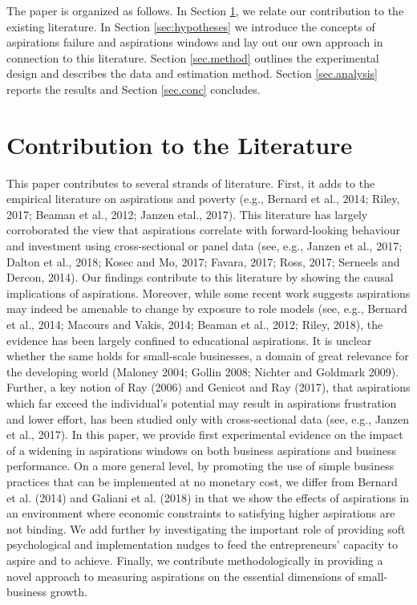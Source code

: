 \documentclass[11.5pt]{article}
\begin{document}
The paper is organized as follows. In Section \ref{sec:cont}, we relate our contribution to the existing literature. In Section \ref{sec:hypotheses} we introduce the concepts of aspirations failure and aspirations windows and lay out our own approach in connection to this literature. Section \ref{sec.method} outlines the experimental design and \label{sec.data} describes the data and estimation method. Section \ref{sec.analysis} reports the results and Section \ref{sec.conc} concludes.

\section{Contribution to the Literature} \label{sec:cont}

This paper contributes to several strands of literature. First, it adds to the empirical literature on aspirations and poverty (e.g., Bernard et al., 2014; Riley, 2017; Beaman et al., 2012; Janzen etal., 2017). This literature has largely corroborated the view that aspirations correlate with forward-looking behaviour and investment using cross-sectional or panel data (see, e.g., Janzen et al., 2017; Dalton et al., 2018; Kosec and Mo, 2017; Favara, 2017; Ross, 2017; Serneels and Dercon, 2014). Our findings contribute to this literature by showing the causal implications of aspirations. Moreover, while some recent work suggests aspirations may indeed be amenable to change by exposure to role models (see, e.g., Bernard et al., 2014; Macours and Vakis, 2014; Beaman et al., 2012; Riley, 2018), the evidence has been largely confined to educational aspirations. It is unclear whether the same holds for small-scale businesses, a domain of great relevance for the developing world (Maloney 2004; Gollin 2008; Nichter and Goldmark 2009). Further, a key notion of Ray (2006) and Genicot and Ray (2017), that aspirations which far exceed the individual's potential may result in aspirations frustration and lower effort, has been studied only with cross-sectional data (see, e.g., Janzen et al., 2017). In this paper, we provide first experimental evidence on the impact of a widening in aspirations windows on both business aspirations and business performance. On a more general level, by promoting the use of simple business practices that can be implemented at no monetary cost, we differ from Bernard et al. (2014) and Galiani et al. (2018) in that we show the effects of aspirations in an environment where economic constraints to satisfying higher aspirations are not binding. We add further by investigating the important role of providing soft psychological and implementation nudges to feed the entrepreneurs' capacity to aspire and to achieve. %
Finally, we contribute methodologically in providing a novel approach to measuring aspirations on the essential dimensions of small-business growth.
\end{document}
